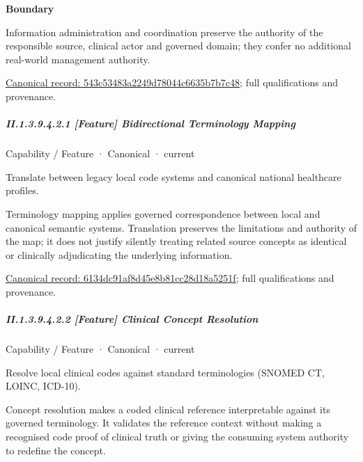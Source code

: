 \textbf{Boundary}



Information administration and coordination preserve the authority of the responsible source, clinical actor and governed domain; they confer no additional real-world management authority.


{\footnotesize \href{../../../../../../../continuum/strategy/capability/543c53483a2249d78044c6635b7b7c48.md}{Canonical record: 543c53483a2249d78044c6635b7b7c48}; full qualifications and provenance.}\par
\subparagraph*{II.1.3.9.4.2.1 [Feature] Bidirectional Terminology Mapping}
\label{navigation:II.1.3.9.4.2.1}

\label{element:6134dc91af8d45e8b81cc28d18a5251f}
{\small Capability / Feature · Canonical · current}\par

Translate between legacy local code systems and canonical national healthcare profiles.



Terminology mapping applies governed correspondence between local and canonical semantic systems. Translation preserves the limitations and authority of the map; it does not justify silently treating related source concepts as identical or clinically adjudicating the underlying information.


{\footnotesize \href{../../../../../../../continuum/strategy/capability/feature/6134dc91af8d45e8b81cc28d18a5251f.md}{Canonical record: 6134dc91af8d45e8b81cc28d18a5251f}; full qualifications and provenance.}\par
\subparagraph*{II.1.3.9.4.2.2 [Feature] Clinical Concept Resolution}
\label{navigation:II.1.3.9.4.2.2}

\label{element:30cdb9b2a810467c9b56e9870de4367e}
{\small Capability / Feature · Canonical · current}\par

Resolve local clinical codes against standard terminologies (SNOMED CT, LOINC, ICD-10).



Concept resolution makes a coded clinical reference interpretable against its governed terminology. It validates the reference context without making a recognised code proof of clinical truth or giving the consuming system authority to redefine the concept.



